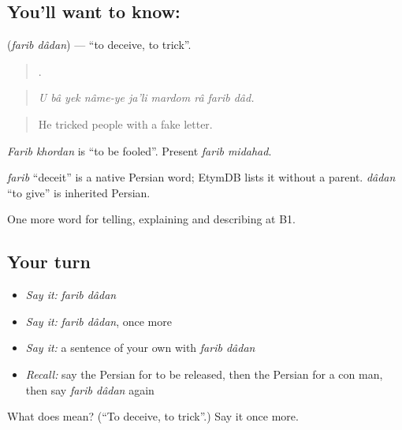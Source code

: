 \subsection*{You'll want to know:  }
\textbf{ } (\emph{farib dâdan}) — \textquotedblleft{}to deceive, to trick\textquotedblright{}.

\begin{quote}
        .
\end{quote}

\begin{quote}
\emph{U bâ yek nâme-ye ja'li mardom râ farib dâd.}
\end{quote}

\begin{quote}
He tricked people with a fake letter.
\end{quote}

\emph{Farib khordan} is \textquotedblleft{}to be fooled\textquotedblright{}. Present \emph{farib midahad}.

\begin{cousinweb}
\emph{farib} \textquotedblleft{}deceit\textquotedblright{} is a native Persian word; EtymDB lists it without a parent. \emph{dâdan} \textquotedblleft{}to give\textquotedblright{} is inherited Persian.
\end{cousinweb}

\begin{grammarlens}[title={What you've built}]
One more word for telling, explaining and describing at B1.
\end{grammarlens}

\subsection*{Your turn}
\begin{itemize}
\raggedright
  \item \emph{Say it:} \emph{farib dâdan}
  \item \emph{Say it:} \emph{farib dâdan}, once more
  \item \emph{Say it:} a sentence of your own with \emph{farib dâdan}
  \item \emph{Recall:} say the Persian for to be released, then the Persian for a con man, then say \emph{farib dâdan} again
\end{itemize}

\begin{tcolorbox}[breakable,colback=teal!4,colframe=teal!35!black,title={Before you move on}]
What does   mean? (\textquotedblleft{}To deceive, to trick\textquotedblright{}.) Say it once more.
\end{tcolorbox}
